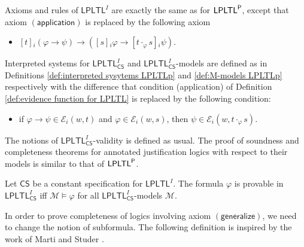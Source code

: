 \documentclass[envcountsect,envcountsame,oribibl,orivec]{llncs}
\newcommand{\limplies}{\rightarrow}
\newcommand{\LPLTLp}{\textsf{LPLTL}^{\sf P}}
\newcommand{\LPLTL}{\textsf{LPLTL}}
\newcommand{\jbox}[1]{\left[#1\right]\!}
\newcommand{\tapp}{\cdot}
\newcommand{\appax}{\ensuremath{(\textsf{application})}}
\newcommand{\CS}{\textsf{CS}}
\newcommand{\agent}{i}
\newcommand{\generalizeprinciple}{\ensuremath{(\textsf{generalize})}}
\newcommand{\evidence}{\mathcal{E}}
\newcommand{\M}{\mathcal{M}}
\renewcommand{\phi}{\varphi}
\begin{document}
Axioms and rules of $\LPLTL^I$ are exactly the same as for $\LPLTLp$, except that axiom $\appax$ is replaced by the following  axiom

\begin{itemize}
	\item  $\jbox{t}_\agent (\phi \limplies \psi) \limplies (\jbox{s}_\agent \phi \limplies \jbox{t \tapp_\phi s}_\agent \psi)$.
\end{itemize}


Interpreted systems for $\LPLTL_\CS^I$ and $\LPLTL_\CS^I$-models are defined as in Definitions \ref{def:interpreted sysytems LPLTLp} and \ref{def:M-models LPLTLp} respectively with the difference that condition (application) of Definition \ref{def:evidence function for LPLTL} is replaced by the following condition:

\begin{itemize}
	\item if $\phi \limplies \psi \in \evidence_\agent(w,t)$ and $\phi \in \evidence_\agent(w,s)$, then $\psi \in \evidence_\agent(w, t \tapp_\phi s)$.
\end{itemize}

The notions of $\LPLTL_\CS^I$-validity is defined as usual.
The proof of soundness and completeness theorems for annotated justification logics  with respect to their models is similar to that of $\LPLTLp$.

\begin{theorem}\label{thm:Sound Compl JL^a}
	Let $\CS$ be a constant specification for $\LPLTL^I$. The formula $\phi$ is provable in  $\LPLTL_\CS^I$ if{f} $\M \models \phi$ for all $\LPLTL_\CS^I$-models $\M$.
\end{theorem}

In order to prove completeness of logics involving axiom $\generalizeprinciple$, we need to change the notion of subformula. The following definition is inspired by the work of Marti and Studer \cite{MartiStuder2018}.
\end{document}
